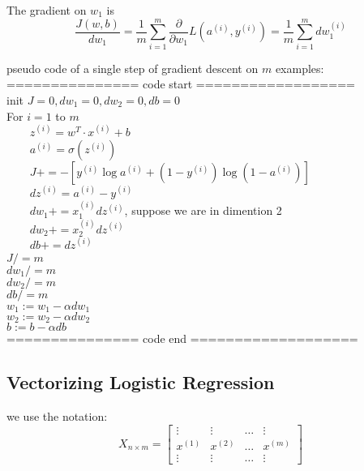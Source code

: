 The gradient on $w_1$ is $$ \dfrac{J(w, b)}{dw_1} = \dfrac{1}{m} \sum_{i = 1}^m \dfrac{\partial}{\partial w_1} L(a^{(i)}, y^{(i)}) = \dfrac{1}{m} \sum_{i = 1}^m dw^{(i)}_1 $$

pseudo code of a single step of gradient descent on $m$ examples: \\
=============== code start ================== \\
init $J = 0, dw_1 = 0, dw_2 = 0, db = 0$ \\
For $i = 1$ to $m$ \\
\verb+    + $z^{(i)} = w^T \cdot x^{(i)} + b$ \\
\verb+    + $a^{(i)} = \sigma(z^{(i)})$ \\
\verb+    + $J += -[y^{(i)} \log a^{(i)} + (1 - y^{(i)}) \log (1 - a^{(i)})]$ \\
\verb+    + $dz^{(i)} = a^{(i)} - y^{(i)}$ \\
\verb+    + $dw_1 += x^{(i)}_1 dz^{(i)}$, suppose we are in dimention 2 \\
\verb+    + $dw_2 += x^{(i)}_2 dz^{(i)}$ \\
\verb+    + $db += dz^{(i)}$ \\
$J /= m$ \\
$dw_1 /= m$ \\
$dw_2 /= m$ \\
$db /= m$ \\
$w_1 := w_1 - \alpha dw_1$ \\
$w_2 := w_2 - \alpha dw_2$ \\
$b := b - \alpha db$ \\
=============== code end ===================

\subsection{Vectorizing Logistic Regression}
we use the notation:
$$
X_{n \times m} =
\begin{bmatrix}
	\vdots & \vdots & \ldots & \vdots \\
	x^{(1)} & x^{(2)} & \ldots & x^{(m)} \\
	\vdots & \vdots & \ldots & \vdots
\end{bmatrix}
$$

